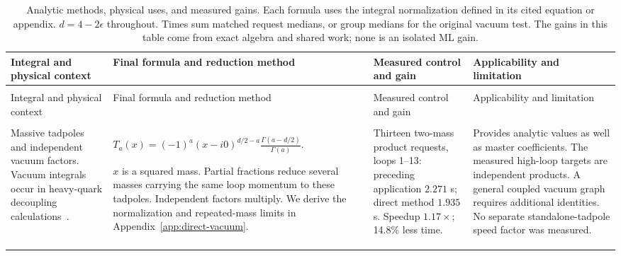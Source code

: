 \begin{landscape}
\small
\setlength{\tabcolsep}{5pt}
\renewcommand{\arraystretch}{1.12}
\begin{longtable}{@{}>{\raggedright\arraybackslash}p{3.9cm}>{\raggedright\arraybackslash}p{8.0cm}>{\raggedright\arraybackslash}p{5.1cm}>{\raggedright\arraybackslash}p{6.2cm}@{}}
\caption{Analytic methods, physical uses, and measured gains. Each formula uses the integral normalization defined in its cited equation or appendix. $d=4-2\epsilon$ throughout. Times sum matched request medians, or group medians for the original vacuum test. The gains in this table come from exact algebra and shared work; none is an isolated ML gain.}\label{tab:integral-methods}\\
\toprule
Integral and physical context & Final formula and reduction method & Measured control and gain & Applicability and limitation\\\midrule
\endfirsthead
\multicolumn{4}{l}{\tablename~\thetable\ continued}\\
\toprule Integral and physical context & Final formula and reduction method & Measured control and gain & Applicability and limitation\\\midrule
\endhead
\midrule\multicolumn{4}{r}{Continued on the next page}\\\endfoot
\bottomrule\endlastfoot
Massive tadpoles and independent vacuum factors. Vacuum integrals occur in heavy-quark decoupling calculations~\cite{SchroderSteinhauser2006}.
& $\displaystyle T_a(x)=(-1)^a(x-i0)^{d/2-a}\frac{\Gamma(a-d/2)}{\Gamma(a)}$.
\par $x$ is a squared mass. Partial fractions reduce several masses carrying the same loop momentum to these tadpoles. Independent factors multiply. We derive the normalization and repeated-mass limits in Appendix~\ref{app:direct-vacuum}.
& Thirteen two-mass product requests, loops 1--13: preceding application $2.271$ s; direct method $1.935$ s. Speedup $1.17\times$; 14.8\% less time.
& Provides analytic values as well as master coefficients. The measured high-loop targets are independent products. A general coupled vacuum graph requires additional identities. No separate standalone-tadpole speed factor was measured.\\\addlinespace[7pt]


\end{longtable}
\end{landscape}
